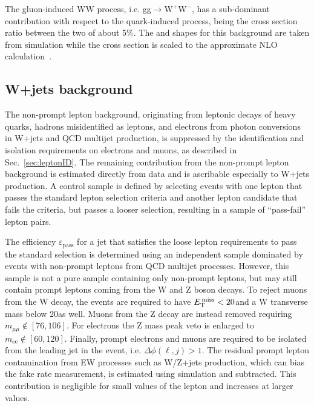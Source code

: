 The gluon-induced WW process, i.e. gg$\to \mathrm{W^{+}W^{-}}$, has a sub-dominant contribution with respect to the quark-induced process, being the cross section ratio between the two of about 5\%. The \mll and \mt shapes for this background are taken from simulation while the cross section is scaled to the approximate NLO calculation~\cite{Bonvini:2013jha,Passarino:2013bha}.




\subsection{W+jets background\label{sec:wjetsbkg}}	

The non-prompt lepton background, originating from leptonic decays of heavy quarks, hadrons
misidentified as leptons, and electrons from photon conversions in W+jets and QCD multijet production, is suppressed by the identification and isolation requirements on electrons and muons,  as described in Sec.~\ref{sec:leptonID}. The remaining contribution from the non-prompt lepton background is estimated directly from data and is ascribable especially to W+jets production. A control sample is defined by selecting events with one lepton that passes the standard lepton selection criteria and another lepton candidate that fails the criteria, but passes a looser selection, resulting in a sample of ``pass-fail'' lepton pairs. 

The efficiency $\varepsilon_\mathrm{pass}$ for a jet that satisfies the loose lepton requirements to pass the standard selection is determined using an independent sample dominated by events with non-prompt leptons from QCD multijet processes. However, this sample is not a pure sample containing only non-prompt leptons, but may still contain prompt leptons coming from the W and Z boson decays. To reject muons from the W decay, the events are required to have $E_\mathrm{T}^\mathrm{\,miss}<20$\GeV and a W transverse mass below 20\GeV as well. Muons from the Z decay are instead removed requiring $m_{\mu\mu} \notin [76,106]$\GeV. For electrons the Z mass peak veto is enlarged to $m_\mathrm{ee} \notin [60,120]$\GeV. Finally, prompt electrons and muons are required to be isolated from the leading jet in the event, i.e. $\Delta\phi(\ell,j)>1$. The residual prompt lepton contamination from EW processes such as W/Z+jets production, which can bias the fake rate measurement, is estimated using simulation and subtracted. This contribution is negligible for small values of the lepton \pt and increases at larger values.

